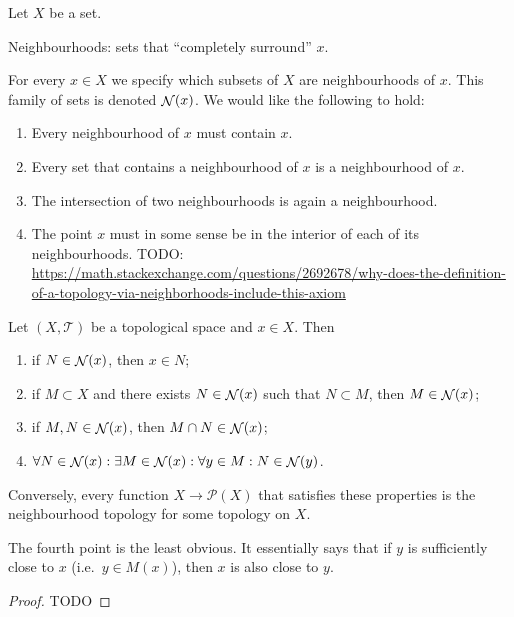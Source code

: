 Let $X$ be a set.

Neighbourhoods: sets that ``completely surround'' $x$.

For every $x\in X$ we specify which subsets of $X$ are neighbourhoods of $x$. This family of sets is denoted $\mathop{\mathcal{N}}(x)$. We would like the following to hold:
\begin{enumerate}
\item Every neighbourhood of $x$ must contain $x$.
\item Every set that contains a neighbourhood of $x$ is a neighbourhood of $x$.
\item The intersection of two neighbourhoods is again a neighbourhood.
\item The point $x$ must in some sense be in the interior of each of its neighbourhoods. TODO: \url{https://math.stackexchange.com/questions/2692678/why-does-the-definition-of-a-topology-via-neighborhoods-include-this-axiom}
\end{enumerate}

\begin{proposition}
Let $(X,\mathcal{T})$ be a topological space and $x\in X$. Then
\begin{enumerate}
\item if $N\in\mathop{\mathcal{N}}(x)$, then $x\in N$;
\item if $M\subset X$ and there exists $N\in\mathop{\mathcal{N}}(x)$ such that $N\subset M$, then $M\in\mathop{\mathcal{N}}(x)$;
\item if $M,N\in\mathop{\mathcal{N}}(x)$, then $M\cap N\in\mathop{\mathcal{N}}(x)$;
\item $\forall N\in\mathop{\mathcal{N}}(x): \exists M\in\mathop{\mathcal{N}}(x): \forall y\in M: N\in\mathop{\mathcal{N}}(y)$.
\end{enumerate}
Conversely, every function $X\to \mathcal{P}(X)$ that satisfies these properties is the neighbourhood topology for some topology on $X$.
\end{proposition}
The fourth point is the least obvious. It essentially says that if $y$ is sufficiently close to $x$ (i.e.\ $y\in M(x)$), then $x$ is also close to $y$.
\begin{proof}
TODO
\end{proof}

